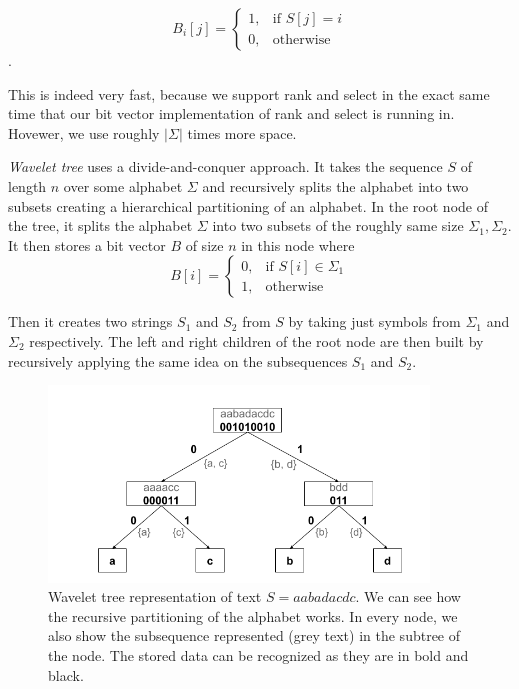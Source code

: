 \[
    B_i[j]= 
\begin{cases}
	1,& \text{if } S[j]=i \\
    0,& \text{otherwise}
\end{cases}
\].

This is indeed very fast, because we support rank and select in the exact same time
that our bit vector implementation of rank and select is running in. Hovewer, we use
roughly $|\Sigma|$ times more space.

\textit{Wavelet tree} uses a divide-and-conquer approach. It takes the sequence $S$ of
length $n$ over some alphabet $\Sigma$ and recursively splits the alphabet into
two subsets creating a hierarchical partitioning of an alphabet. In the root node
of the tree, it splits the alphabet $\Sigma$ into two subsets of the roughly same
size $\Sigma_1, \Sigma_2$. It then stores a bit vector $B$ of size $n$ in this node
where
\[
    B[i]= 
\begin{cases}
    0,& \text{if } S[i]\in \Sigma_1\\
    1,              & \text{otherwise}
\end{cases}
\]

Then it creates two strings $S_1$ and $S_2$ from $S$ by taking just symbols
from $\Sigma_1$ and $\Sigma_2$ respectively. The left and right children of the root node
are then built by recursively applying the same idea on the subsequences $S_1$ and $S_2$.

\begin{figure}
	\centerline{
		\includegraphics[width=0.9\textwidth, height=0.3\textheight]{images/wavelet_tree}
	}
	\caption[TODO]{Wavelet tree representation of text $S=aabadacdc$. We can see how the
	recursive partitioning of the alphabet works. In every node, we also show the
	subsequence represented (grey text) in the subtree of the node. The stored data can be
	recognized as they are in bold and black.
	}
	\label{obr:WaveletTreeExample}
\end{figure}

